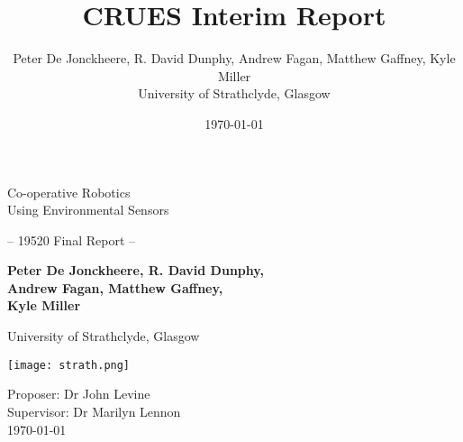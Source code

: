 
\title{CRUES Interim Report}
\author{Peter De Jonckheere, R. David Dunphy, Andrew Fagan, Matthew Gaffney,
Kyle Miller\\University of Strathclyde, Glasgow}
\date{\today}

\thispagestyle{empty}
\begin{center}

    \LARGE
    Co-operative Robotics\\Using Environmental Sensors

    \vspace{1.5cm}

    \large
    -- 19520 Final Report --

    \vspace{1.5cm}

    \textbf{Peter De Jonckheere, R. David Dunphy,\\Andrew Fagan,
        Matthew Gaffney,\\Kyle Miller}

    \vspace{0.3cm}

    University of Strathclyde, Glasgow

    \vspace{2cm}
    \texttt{[image: strath.png]}

    \vfill{}

    \normalsize
    Proposer: Dr John Levine\\
    Supervisor: Dr Marilyn Lennon\\
    \today

\end{center}
\restoregeometry{}
